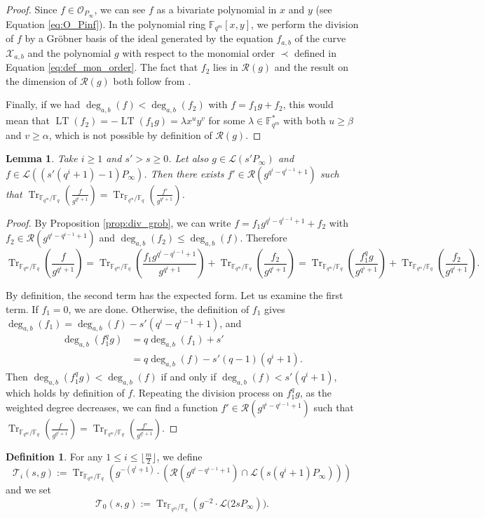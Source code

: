 \documentclass[a4paper]{amsart}
\newtheorem{lemma}[thm]{Lemma}
\theoremstyle{definition}
\newtheorem{definition}[thm]{Definition}
\theoremstyle{remark}
\newcommand{\calL}{\mathcal{L}}
\newcommand{\calO}{\mathcal{O}}
\newcommand{\calR}{\mathcal{R}}
\newcommand{\calT}{\mathcal{T}}
\newcommand{\calX}{\mathcal{X}}
\newcommand{\fq}{\mathbb{F}_{q}}
\newcommand{\F}{\mathbb{F}}
\newcommand{\Tr}[1]{\operatorname{Tr}_{\mathbb{F}_{q^m}/\fq}\left(#1\right)}
\newcommand{\LT}[1]{\operatorname{LT}\left(#1\right)}
\newcommand{\degab}[1]{\deg_{a,b}\left(#1\right)}
\begin{document}
\begin{proof}
  Since $f \in \calO_{P_\infty}$, we can see $f$ as a bivariate polynomial in $x$ and $y$ (see Equation \ref{eq:O_Pinf}). In the polynomial ring $\F_{q^m}[x,y]$, we perform the division of $f$ by a Gr\"obner basis of the ideal generated by the equation $f_{a,b}$ of the curve $\calX_{a,b}$ and the polynomial $g$ with respect to the monomial order $\prec$ defined in Equation \eqref{eq:def_mon_order}. The fact that $f_2$ lies in $\calR(g)$ and the result on the dimension of $\calR(g)$ both follow from \cite[Proposition 4]{GH00}.
 
 Finally, if we had $\degab{f} < \degab{f_2}$ with $f=f_1 g +f_2$, this would mean that $\LT{f_2}=-\LT{f_1 g}=\lambda x^uy^v$ for some $\lambda \in \F_{q^m}^*$ with both $u \geq \beta$ and $v \geq \alpha$, which is not possible by definition of $\calR\left(g\right)$.
\end{proof}

\begin{lemma} \label{lem:weighted_division}
Take $i \geq 1$ and $s'>s \geq 0$. Let also $g \in \calL\left(s'P_\infty\right)$ and $f \in \calL\left(\left(s'(q^i+1)-1\right)P_\infty\right)$. Then there exists $f' \in \calR\left(g^{q^i-q^{i-1}+1}\right)$ such that $\Tr{\frac{f}{g^{q^i+1}}} = \Tr{\frac{f'}{g^{q^i+1}}} $.
\end{lemma}

\begin{proof}
By Proposition \ref{prop:div_grob}, we can write $f=f_1 g^{q^i-q^{i-1}+1} +f_2$ with
 $f_2 \in \calR\left(g^{q^i-q^{i-1}+1}\right)$ and $\degab{f_2} \leq \degab{f}$. Therefore
 \[\Tr{\frac{f}{g^{q^i+1}}}=\Tr{\frac{f_1 g^{q^i-q^{i-1}+1}}{g^{q^i+1}}} +\Tr{\frac{f_2}{g^{q^i+1}}}= \Tr{\frac{f_1^qg}{g^{q^i+1}}} +\Tr{\frac{f_2}{g^{q^i+1}}}. \]
 
 By definition, the second term has the expected form. Let us examine the first term. If $f_1=0$, we are done. Otherwise, the definition of $f_1$ gives
$\degab{f_1} =\degab{f} - s'(q^i-q^{i-1}+1)$, and
 \begin{align*}
 \degab{f_1^qg}  &= q \degab{f_1} + s'\\
     &= q\degab{f} - s'(q-1)(q^i+1).
 \end{align*} 
Then  $\degab{f_1^qg} < \degab{f}$ if and only if $\degab{f} < s'(q^i+1)$, which holds by definition of $f$. Repeating the division process on $f_1^qg$, as the weighted degree decreases, we can find a function $f' \in \calR\left(g^{q^i-q^{i-1}+1}\right)$ such that $\Tr{\frac{f}{g^{q^i+1}}} = \Tr{\frac{f'}{g^{q^i+1}}} $.
\end{proof}
\begin{definition} \label{def:T_i's}
For any $1 \leq i \leq \lfloor\frac{m}{2}\rfloor$, we define
$$\calT_i(s,g):= \Tr{g^{-(q^i+1)}\cdot \left( \calR\left(g^{q^i-q^{i-1}+1}\right)  \cap \calL(s(q^i+1)P_\infty)\right)}$$
and we set $$\calT_0(s,g) := \Tr{g^{-2} \cdot \calL(2sP_\infty}).$$
\end{definition}
\end{document}
